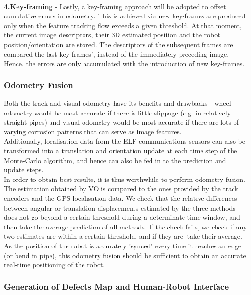 \documentclass[11pt]{article}		%
\newcommand{\supercite}[1]{\textsuperscript{\cite{#1}}}		%
\begin{document}
    \textbf{4.Key-framing} - Lastly, a key-framing approach\supercite{keyframing} will be adopted to offset cumulative errors in odometry. This is achieved via new key-frames are produced only when the feature tracking flow exceeds a given threshold. At that moment, the current image descriptors, their 3D estimated position and the robot position/orientation are stored. The descriptors of the subsequent frames are compared the last key-frames', instead of the immediately preceding image. Hence, the errors are only accumulated with the introduction of new key-frames.

	\subsubsection{Odometry Fusion} \label{odometryFusion}
	Both the track and visual odometry have its benefits and drawbacks - wheel odometry would be most accurate if there is little slippage (e.g. in relatively straight pipes) and visual odometry would be most accurate if there are lots of varying corrosion patterns that can serve as image features.
	\\
    \hspace*{3ex}Additionally, localisation data from the ELF communications sensors can also be transformed into a translation and orientation update at each time step of the Monte-Carlo algorithm, and hence can also be fed in to the prediction and update steps.
	\\
	\hspace*{3ex}In order to obtain best results, it is thus worthwhile to perform odometry fusion. The estimation obtained by VO is compared to the ones provided by the track encoders and the GPS localisation data. We check that the relative differences between angular or translation displacements estimated by the three methods does not go beyond a certain threshold during a determinate time window, and then take the average prediction of all methods. If the check fails, we check if any two estimates are within a certain threshold, and if they are, take their average. As the position of the robot is accurately 'synced' every time it reaches an edge (or bend in pipe), this odometry fusion should be sufficient to obtain an accurate real-time positioning of the robot. 
	
	\subsubsection{Generation of Defects Map and Human-Robot Interface}
	
\end{document}
